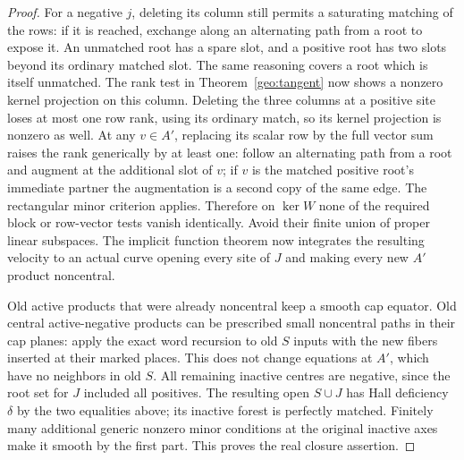 \begin{proof}
For a negative \(j\), deleting its column still permits a saturating matching of the rows: if it is reached, exchange along an alternating path from a root to expose it. An unmatched root has a spare slot, and a positive root has two slots beyond its ordinary matched slot. The same reasoning covers a root which is itself unmatched. The rank test in Theorem~\ref{geo:tangent} now shows a nonzero kernel projection on this column. Deleting the three columns at a positive site loses at most one row rank, using its ordinary match, so its kernel projection is nonzero as well. At any \(v\in A'\), replacing its scalar row by the full vector sum raises the rank generically by at least one: follow an alternating path from a root and augment at the additional slot of \(v\); if \(v\) is the matched positive root's immediate partner the augmentation is a second copy of the same edge. The rectangular minor criterion applies. Therefore on \(\ker W\) none of the required block or row-vector tests vanish identically. Avoid their finite union of proper linear subspaces. The implicit function theorem now integrates the resulting velocity to an actual curve opening every site of \(J\) and making every new \(A'\) product noncentral.

Old active products that were already noncentral keep a smooth cap equator. Old central active-negative products can be prescribed small noncentral paths in their cap planes: apply the exact word recursion to old \(S\) inputs with the new fibers inserted at their marked places. This does not change equations at \(A'\), which have no neighbors in old \(S\). All remaining inactive centres are negative, since the root set for \(J\) included all positives. The resulting open \(S\cup J\) has Hall deficiency \(\delta\) by the two equalities above; its inactive forest is perfectly matched. Finitely many additional generic nonzero minor conditions at the original inactive axes make it smooth by the first part. This proves the real closure assertion.
\end{proof}

